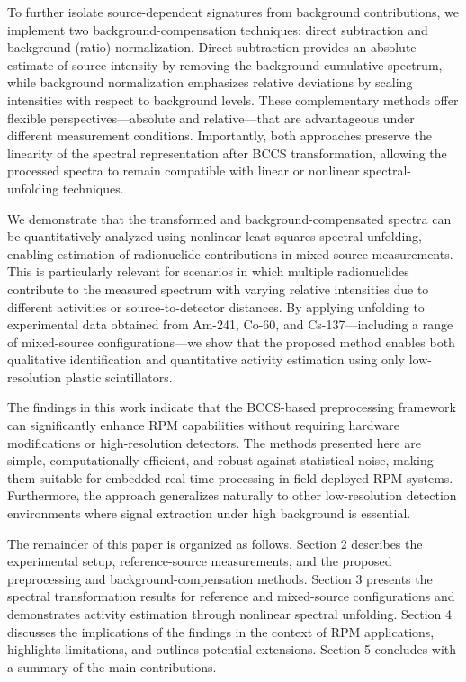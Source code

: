 \documentclass[10pt]{wlscirep}
\begin{document}
To further isolate source-dependent signatures from background contributions, we implement two background-compensation techniques: direct subtraction and background (ratio) normalization. Direct subtraction provides an absolute estimate of source intensity by removing the background cumulative spectrum, while background normalization emphasizes relative deviations by scaling intensities with respect to background levels. These complementary methods offer flexible perspectives—absolute and relative—that are advantageous under different measurement conditions. Importantly, both approaches preserve the linearity of the spectral representation after BCCS transformation, allowing the processed spectra to remain compatible with linear or nonlinear spectral-unfolding techniques.

We demonstrate that the transformed and background-compensated spectra can be quantitatively analyzed using nonlinear least-squares spectral unfolding, enabling estimation of radionuclide contributions in mixed-source measurements. This is particularly relevant for scenarios in which multiple radionuclides contribute to the measured spectrum with varying relative intensities due to different activities or source-to-detector distances. By applying unfolding to experimental data obtained from Am-241, Co-60, and Cs-137—including a range of mixed-source configurations—we show that the proposed method enables both qualitative identification and quantitative activity estimation using only low-resolution plastic scintillators.

The findings in this work indicate that the BCCS-based preprocessing framework can significantly enhance RPM capabilities without requiring hardware modifications or high-resolution detectors. The methods presented here are simple, computationally efficient, and robust against statistical noise, making them suitable for embedded real-time processing in field-deployed RPM systems. Furthermore, the approach generalizes naturally to other low-resolution detection environments where signal extraction under high background is essential.

The remainder of this paper is organized as follows. Section 2 describes the experimental setup, reference-source measurements, and the proposed preprocessing and background-compensation methods. Section 3 presents the spectral transformation results for reference and mixed-source configurations and demonstrates activity estimation through nonlinear spectral unfolding. Section 4 discusses the implications of the findings in the context of RPM applications, highlights limitations, and outlines potential extensions. Section 5 concludes with a summary of the main contributions.
\end{document}
